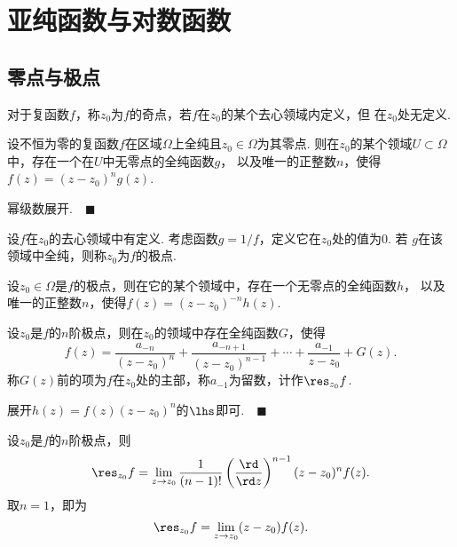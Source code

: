 \section{亚纯函数与对数函数}

\subsection{零点与极点}

  \begin{defi}[奇点]
    对于复函数$f$，称$z_0$为$f$的奇点，若$f$在$z_0$的某个去心领域内定义，但
    在$z_0$处无定义.
  \end{defi}

  \begin{thm}
    \label{thm: 零点、分离}
    设不恒为零的复函数$f$在区域$\Omega$上全纯且$z_0\in\Omega$为其零点.
    则在$z_0$的某个领域$U\subset\Omega$中，存在一个在$U$中无零点的全纯函数$g$，
    以及唯一的正整数$n$，使得$f(z)=(z-z_0)^ng(z)$.
  \end{thm}
  \proof
    幂级数展开.$\quad\blacksquare$

  \begin{defi}[极点]
    设$f$在$z_0$的去心领域中有定义. 考虑函数$g=1/f$，定义它在$z_0$处的值为$0$. 若
    $g$在该领域中全纯，则称$z_0$为$f$的极点.
  \end{defi}

  \begin{thm}
    设$z_0\in\Omega$是$f$的极点，则在它的某个领域中，存在一个无零点的全纯函数$h$，
    以及唯一的正整数$n$，使得$f(z)=(z-z_0)^{-n}h(z)$.
  \end{thm}

  \begin{thm}
    \label{thm: 极点展开}
    设$z_0$是$f$的$n$阶极点，则在$z_0$的领域中存在全纯函数$G$，使得
    \[
      f(z) = \frac{a_{-n}}{(z-z_0)^n} + \frac{a_{-n+1}}{(z-z_0)^{n-1}} + \cdots +
      \frac{a_{-1}}{z-z_0} + G(z).
    \]
    称$G(z)$前的项为$f$在$z_0$处的主部，称$a_{-1}$为留数，计作$\res_{z_0}f$.
  \end{thm}
  \proof
    展开$h(z)=f(z)(z-z_0)^n$的$\lhs$即可.$\quad\blacksquare$

  \begin{thm}[留数的计算]
    设$z_0$是$f$的$n$阶极点，则
    \[
      \res_{z_0}f = \lim_{z\to z_0}\frac{1}{(n-1)!}
      \left(\frac{\rd}{\rd z}\right)^{n-1}(z-z_0)^nf(z).
    \]
    取$n=1$，即为
    \[
     \res_{z_0}f = \lim_{z\to z_0}(z-z_0)f(z). 
    \]
  \end{thm}

